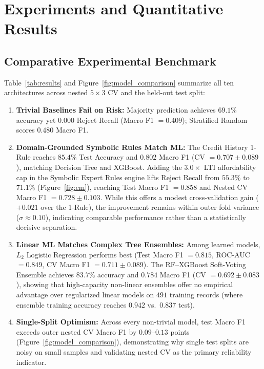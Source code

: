 \documentclass{COMPXXXX}
\begin{document}
\section{Experiments and Quantitative Results}
\label{sec:results}

\subsection{Comparative Experimental Benchmark}
Table~\ref{tab:results} and Figure~\ref{fig:model_comparison} summarize all ten architectures across nested $5\times 3$ CV and the held-out test split:
\begin{enumerate}
    \item \textbf{Trivial Baselines Fail on Risk:} Majority prediction achieves $69.1\%$ accuracy yet $0.000$ Reject Recall (Macro F1 $=0.409$); Stratified Random scores $0.480$ Macro F1.
    \item \textbf{Domain-Grounded Symbolic Rules Match ML:} The Credit History 1-Rule reaches $85.4\%$ Test Accuracy and $0.802$ Macro F1 (CV $=0.707 \pm 0.089$), matching Decision Tree and XGBoost. Adding the $3.0\times$ LTI affordability cap in the Symbolic Expert Rules engine lifts Reject Recall from $55.3\%$ to $71.1\%$ (Figure~\ref{fig:cm}), reaching Test Macro F1 $=0.858$ and Nested CV Macro F1 $=0.728 \pm 0.103$. While this offers a modest cross-validation gain ($+0.021$ over the 1-Rule), the improvement remains within outer fold variance ($\sigma \approx 0.10$), indicating comparable performance rather than a statistically decisive separation.
    \item \textbf{Linear ML Matches Complex Tree Ensembles:} Among learned models, $L_2$ Logistic Regression performs best (Test Macro F1 $=0.815$, ROC-AUC $=0.849$, CV Macro F1 $=0.711 \pm 0.089$). The RF--XGBoost Soft-Voting Ensemble achieves $83.7\%$ accuracy and $0.784$ Macro F1 (CV $=0.692 \pm 0.083$), showing that high-capacity non-linear ensembles offer no empirical advantage over regularized linear models on $491$ training records (where ensemble training accuracy reaches $0.942$ vs.\ $0.837$ test).
    \item \textbf{Single-Split Optimism:} Across every non-trivial model, test Macro F1 exceeds outer nested CV Macro F1 by $0.09$--$0.13$ points (Figure~\ref{fig:model_comparison}), demonstrating why single test splits are noisy on small samples and validating nested CV as the primary reliability indicator.
\end{enumerate}
\end{document}

